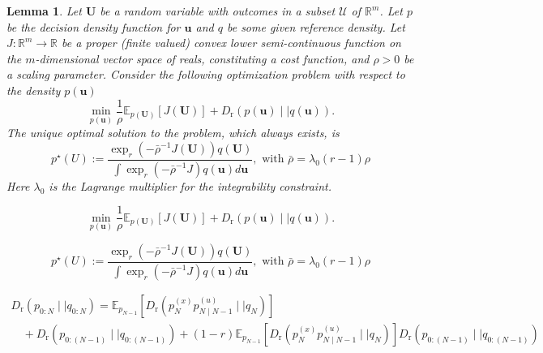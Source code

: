 \documentclass[10pt,a4paper]{amsart}
\newtheorem{lemma}{Lemma}
\newcommand{\Dr}[2]{{D}_{\text{r}}\left(#1\mid \mid #2 \right)}
\newcommand{\E}{\mathbb{E}}
\newcommand{\R}{\mathbb{R}}
\newcommand{\bv}[1]{\mathbf{#1}}
\newcommand{\sU}{\mathcal{U}}
\newcommand{\shortplant}[1]{p_{{#1}}^{(x)}}
\newcommand{\shortpolicy}[2]{p_{{#1}\mid{#2}}^{(u)}}
\begin{document}
\begin{lemma}\label{lem:densitysolution0}
Let $\bv{U}$ be a random variable with outcomes in a subset $\sU$ of $\R^{m}$. Let $p$  be the decision density function for $\bv{u}$ and $q$ be some given reference density. Let $J:\R^m\to\R$ be a proper (finite valued) convex lower semi-continuous function on the $m$-dimensional vector space of reals, constituting a cost function, and $\rho>0$ be a scaling parameter. Consider the following  optimization problem with respect to the density $p(\bv{u})$
    \begin{equation}\label{eq:gentsopt0}
\min_{p(\bv{u})} \frac{1}{\rho}\mathbb{E}_{p(\bv{U})} [J(\bv{U})] +\Dr{p(\bv{u})}{q(\bv{u})}.
    \end{equation}
The unique optimal solution to the problem, which always exists, is
    \begin{equation}\label{eq:gentssol0}
        p^\star(U):= \frac{\exp_r\left(-\bar{\rho}^{-1} J(\bv{U})\right)q(\bv{U})}{\int \exp_r\left(-\bar{\rho}^{-1} J\right)q(\bv{\bv{u}}) d\bv{u}},\,\,\text{with }\bar{\rho} = \lambda_0(r-1)\rho
    \end{equation}
    Here $\lambda_0$ is the Lagrange multiplier for the integrability constraint.
\end{lemma}

    \begin{equation}
\min_{p(\bv{u})} \frac{1}{\rho}\mathbb{E}_{p(\bv{U})} [J(\bv{U})] +\Dr{p(\bv{u})}{q(\bv{u})}.
    \end{equation}

    \begin{equation}
        p^\star(U):= \frac{\exp_r\left(-\bar{\rho}^{-1} J(\bv{U})\right)q(\bv{U})}{\int \exp_r\left(-\bar{\rho}^{-1} J\right)q(\bv{\bv{u}}) d\bv{u}},\,\,\text{with }\bar{\rho} = \lambda_0(r-1)\rho
    \end{equation}

\begin{equation}\label{eq:sumndecompose}
\begin{array}{l}
\Dr{p_{0:N}}{q_{0:N}} = \E_{p_{N-1}}\left[\Dr{\shortplant{N}\shortpolicy{N}{N-1}}{q_N}\right]
\\ \quad +\Dr{p_{0:(N-1)}}{q_{0:(N-1)}}+(1-r)\E_{p_{N-1}}\left[\Dr{\shortplant{N}\shortpolicy{N}{N-1}}{q_N}\right]\Dr{p_{0:(N-1)}}{q_{0:(N-1)}} 
\end{array}
\end{equation}
\end{document}
